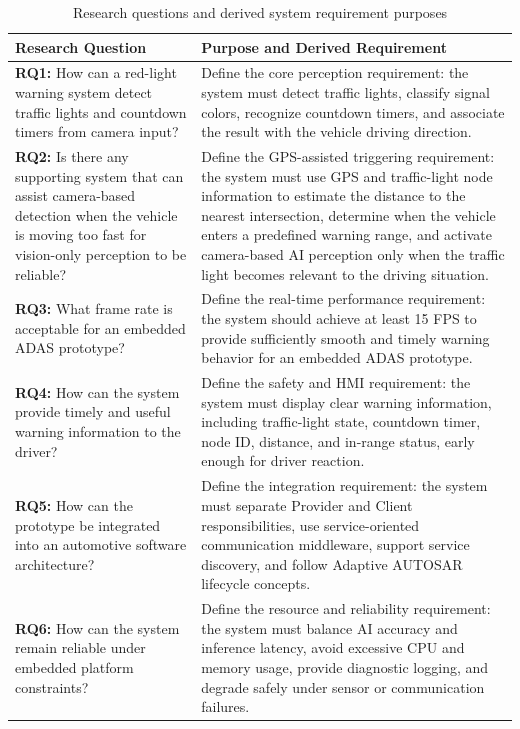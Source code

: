 \begin{table}[H]
\centering
\renewcommand{\arraystretch}{1.35}
\begin{tabular}{|p{}|p{}|}
\hline
\textbf{Research Question} & \textbf{Purpose and Derived Requirement} \\
\hline
\textbf{RQ1:} How can a red-light warning system detect traffic lights and countdown timers from camera input? & Define the core perception requirement: the system must detect traffic lights, classify signal colors, recognize countdown timers, and associate the result with the vehicle driving direction. \\
\hline
\textbf{RQ2:} Is there any supporting system that can assist camera-based detection when the vehicle is moving too fast for vision-only perception to be reliable? & Define the GPS-assisted triggering requirement: the system must use GPS and traffic-light node information to estimate the distance to the nearest intersection, determine when the vehicle enters a predefined warning range, and activate camera-based AI perception only when the traffic light becomes relevant to the driving situation. \\
\hline
\textbf{RQ3:} What frame rate is acceptable for an embedded ADAS prototype? & Define the real-time performance requirement: the system should achieve at least {15 FPS} to provide sufficiently smooth and timely warning behavior for an embedded ADAS prototype. \\
\hline
\textbf{RQ4:} How can the system provide timely and useful warning information to the driver? & Define the safety and HMI requirement: the system must display clear warning information, including traffic-light state, countdown timer, node ID, distance, and in-range status, early enough for driver reaction. \\
\hline
\textbf{RQ5:} How can the prototype be integrated into an automotive software architecture? & Define the integration requirement: the system must separate Provider and Client responsibilities, use service-oriented communication middleware, support service discovery, and follow Adaptive AUTOSAR lifecycle concepts. \\
\hline
\textbf{RQ6:} How can the system remain reliable under embedded platform constraints? & Define the resource and reliability requirement: the system must balance AI accuracy and inference latency, avoid excessive CPU and memory usage, provide diagnostic logging, and degrade safely under sensor or communication failures. \\
\hline
\end{tabular}
\caption{Research questions and derived system requirement purposes}
\label{tab:rq_purpose_requirements}
\end{table}

